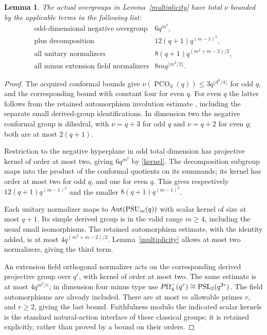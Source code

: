 \documentclass[11pt,a4paper]{article}
\newtheorem{lemma}{Lemma}\newtheorem{proposition}[lemma]{Proposition}
\newcommand{\PCO}{\operatorname{PCO}}\newcommand{\GU}{\operatorname{GU}}
\begin{document}
\begin{lemma}\label{overbound}
The actual overgroups in Lemma~\ref{multiplicity} have total $\nu$
bounded by the applicable terms in the following list:
\begin{equation}\label{overgroupsum}
\begin{array}{ll}
\text{odd-dimensional negative overgroup}&6q^{m^2},\\
\text{plus decomposition}&12(q+1)q^{(m-1)^2},\\
\text{all unitary normalizers}&8(q+1)q^{(m^2+m-2)/2},\\
\text{all minus extension field normalizers}&8m q^{\lfloor m^2/2\rfloor}.
\end{array}
\end{equation}
\end{lemma}
\begin{proof}
The acquired conformal bounds give
$\nu(\PCO_d(q))\le3q^{\lfloor d^2/4\rfloor}$ for odd $q$, and
the corresponding bound with constant four for even $q$.
For even $q$ the latter follows from the retained automorphism
involution estimate \cite[Proposition~1.3]{LLS}, including the
separate small derived-group identifications. In dimension two the
negative conformal group is dihedral, with $\nu=q+3$ for odd $q$
and $\nu=q+2$ for even $q$; both are at most $2(q+1)$.

Restriction to the negative hyperplane in odd total dimension has
projective kernel of order at most two, giving $6q^{m^2}$ by
\eqref{kernel}. The decomposition subgroup maps into the product
of the conformal quotients on its summands; its kernel has order at
most two for odd $q$, and one for even $q$. This gives respectively
$12(q+1)q^{(m-1)^2}$ and the smaller $8(q+1)q^{(m-1)^2}$.

Each unitary normalizer maps to $\operatorname{Aut}(\operatorname{PSU}_m(q))$
with scalar kernel of size at most $q+1$. Its simple derived group
is in the valid range $m\ge4$, including the usual small isomorphisms.
The retained automorphism estimate, with the identity added, is at
most $4q^{(m^2+m-2)/2}$. Lemma~\ref{multiplicity} allows at most
two normalizers, giving the third term.

An extension field orthogonal normalizer acts on the corresponding
derived projective group over $q^r$, with kernel of order at most
two. The same estimate is at most $4q^{m^2/r}$; in dimension four
minus type use $P\Omega^-_4(q^r)\cong\operatorname{PSL}_2(q^{2r})$.
The field automorphisms are already included. There are at most
$m$ allowable primes $r$, and $r\ge2$, giving the last bound.
Faithfulness modulo the indicated scalar kernels is the standard
natural-action interface of these classical groups; it is retained
explicitly, rather than proved by a bound on their orders.
\end{proof}
\end{document}
